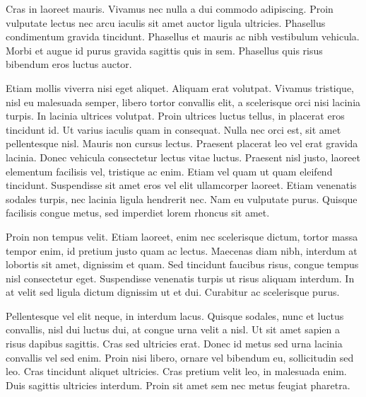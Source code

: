 \documentclass[11pt,epsf]{article}
\begin{document}
\smallskip
\smallskip
\noindent
Cras in laoreet mauris. Vivamus nec nulla a dui commodo
adipiscing. Proin vulputate lectus nec arcu iaculis sit amet auctor
ligula ultricies. Phasellus condimentum gravida tincidunt. Phasellus
et mauris ac nibh vestibulum vehicula. Morbi et augue id purus gravida
sagittis quis in sem. Phasellus quis risus bibendum eros luctus
auctor.

\smallskip
\smallskip
\noindent
Etiam mollis viverra nisi eget aliquet. Aliquam erat volutpat. Vivamus
tristique, nisl eu malesuada semper, libero tortor convallis elit, a
scelerisque orci nisi lacinia turpis. In lacinia ultrices
volutpat. Proin ultrices luctus tellus, in placerat eros tincidunt
id. Ut varius iaculis quam in consequat. Nulla nec orci est, sit amet
pellentesque nisl. Mauris non cursus lectus. Praesent placerat leo vel
erat gravida lacinia. Donec vehicula consectetur lectus vitae
luctus. Praesent nisl justo, laoreet elementum facilisis vel,
tristique ac enim. Etiam vel quam ut quam eleifend
tincidunt. Suspendisse sit amet eros vel elit ullamcorper
laoreet. Etiam venenatis sodales turpis, nec lacinia ligula hendrerit
nec. Nam eu vulputate purus. Quisque facilisis congue metus, sed
imperdiet lorem rhoncus sit amet.

\smallskip
\smallskip
\noindent
Proin non tempus velit. Etiam laoreet, enim nec scelerisque dictum,
tortor massa tempor enim, id pretium justo quam ac lectus. Maecenas
diam nibh, interdum at lobortis sit amet, dignissim et quam. Sed
tincidunt faucibus risus, congue tempus nisl consectetur
eget. Suspendisse venenatis turpis ut risus aliquam interdum. In at
velit sed ligula dictum dignissim ut et dui. Curabitur ac scelerisque
purus.

\smallskip
\smallskip
\noindent
Pellentesque vel elit neque, in interdum lacus. Quisque sodales, nunc
et luctus convallis, nisl dui luctus dui, at congue urna velit a
nisl. Ut sit amet sapien a risus dapibus sagittis. Cras sed ultricies
erat. Donec id metus sed urna lacinia convallis vel sed enim. Proin
nisi libero, ornare vel bibendum eu, sollicitudin sed leo. Cras
tincidunt aliquet ultricies. Cras pretium velit leo, in malesuada
enim. Duis sagittis ultricies interdum. Proin sit amet sem nec metus
feugiat pharetra.
\end{document}

